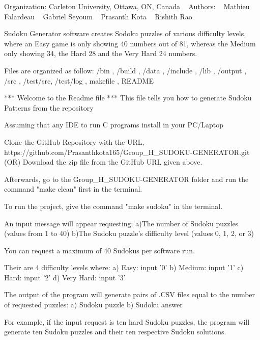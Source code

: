 Organization\+: Carleton University, Ottawa, ON, Canada ~\newline
 Authors\+: ~\newline
 Mathieu Falardeau ~\newline
 Gabriel Seyoum ~\newline
 Prasanth Kota ~\newline
 Rishith Rao ~\newline


Sudoku Generator software creates Sodoku puzzles of various difficulty levels, where an Easy game is only showing 40 numbers out of 81, whereas the Medium only showing 34, the Hard 28 and the Very Hard 24 numbers.

Files are organized as follow\+: /bin , /build , /data , /include , /lib , /output , /src , /test/src, /test/log , makefile , R\+E\+A\+D\+ME \begin{DoxyVerb}                         *** Welcome to the Readme file ***
      This file tells you how to generate Sudoku Patterns from the repository  
\end{DoxyVerb}


Assuming that any I\+DE to run C programs install in your P\+C/\+Laptop ~\newline
 \begin{DoxyVerb}Clone the GitHub Repository with the URL, https://github.com/Prasanthkota165/Group_H_SUDOKU-GENERATOR.git (OR) Download the zip file from the GitHub URL given above.

Afterwards, go to the Group_H_SUDOKU-GENERATOR folder and run the command "make clean" first in the terminal.

To run the project, give the command "make sudoku" in the terminal.  

An input message will appear requesting:  
a)The number of Sudoku puzzles (values from 1 to 40)  
b)The Sudoku puzzle's difficulty level (values 0, 1, 2, or 3)  

You can request a maximum of 40 Sudokus per software run.  

Their are 4 difficulty levels where:   
a) Easy: input '0'  
b) Medium: input '1'  
c) Hard: input '2'  
d) Very Hard: input '3'  

The output of the program will generate pairs of .CSV files equal to the number of requested puzzles:  
a) Sudoku puzzle  
b) Sudoku answer  

For example, if the input request is ten hard Sudoku puzzles, the program will generate ten Sudoku puzzles and their ten respective Sudoku solutions.
\end{DoxyVerb}
 
